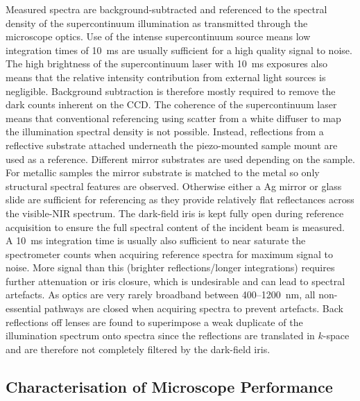 \documentclass{article}
\begin{document}
Measured spectra are background-subtracted and referenced to the spectral density of the supercontinuum illumination as transmitted through the microscope optics. Use of the intense supercontinuum source means low integration times of \SI{10}{ms} are usually sufficient for a high quality signal to noise. The high brightness of the supercontinuum laser with \SI{10}{ms} exposures also means that the relative intensity contribution from external light sources is negligible. Background subtraction is therefore mostly required to remove the dark counts inherent on the CCD.
The coherence of the supercontinuum laser means that conventional referencing using scatter from a white diffuser to map the illumination spectral density is not possible. Instead, reflections from a reflective substrate attached underneath the piezo-mounted sample mount are used as a reference. Different mirror substrates are used depending on the sample. For metallic samples the mirror substrate is matched to the metal so only structural spectral features are observed. Otherwise either a Ag mirror or glass slide are sufficient for referencing as they provide relatively flat reflectances across the visible-NIR spectrum.
The dark-field iris is kept fully open during reference acquisition to ensure the full spectral content of the incident beam is measured. A \SI{10}{ms} integration time is usually also sufficient to near saturate the spectrometer counts when acquiring reference spectra for maximum signal to noise. More signal than this (brighter reflections/longer integrations) requires further attenuation or iris closure, which is undesirable and can lead to spectral artefacts.
As optics are very rarely broadband between 400--\SI{1200}{nm}, all non-essential pathways are closed when acquiring spectra to prevent artefacts. Back reflections off lenses are found to superimpose a weak duplicate of the illumination spectrum onto spectra since the reflections are translated in $k$-space and are therefore not completely filtered by the dark-field iris.

\subsection{Characterisation of Microscope Performance}
\end{document}
